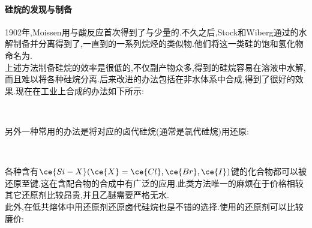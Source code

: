 \documentclass{ctexart}
\begin{document}
\paragraph{硅烷的发现与制备}
1902年,Moissen用与酸反应首次得到了与少量的.不久之后,Stock和Wiberg通过的水解制备并分离得到了,一直到的一系列烷烃的类似物.他们将这一类硅的饱和氢化物命名为.\\
\indent 上述方法制备硅烷的效率是很低的,不仅副产物众多,得到的硅烷容易在溶液中水解,而且难以将各种硅烷分离.后来改进的办法包括在非水体系中合成,得到了很好的效果.现在在工业上合成的办法如下所示:
\begin{center}
    \\
\end{center}
另外一种常用的办法是将对应的卤代硅烷(通常是氯代硅烷)用还原:
\begin{center}
    \\
\end{center}
各种含有$\ce{Si-X}(\ce{X}=\ce{Cl},\ce{Br},\ce{I})$键的化合物都可以被还原至键.这在含配合物的合成中有广泛的应用.此类方法唯一的麻烦在于价格相较其它还原剂比较昂贵,并且乙醚需要严格无水.\\
\indent 此外,在低共熔体中用还原剂还原卤代硅烷也是不错的选择.使用的还原剂可以比较廉价:
\begin{center}
    \\
\end{center}
\end{document}
